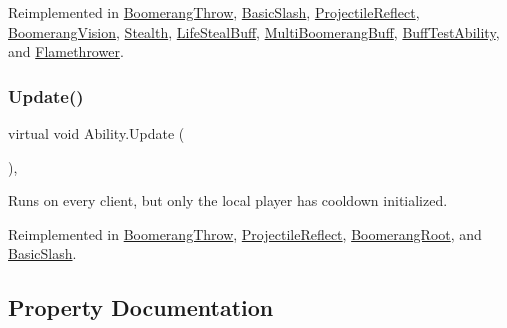 Reimplemented in \hyperlink{class_boomerang_throw_abd3070a4e57ae10d7578d6de618b5c2e}{Boomerang\+Throw}, \hyperlink{class_basic_slash_af42d098906ac33974f266ccc3b2aba6d}{Basic\+Slash}, \hyperlink{class_projectile_reflect_a13bdedc65cb8eed7f5d8a6a733feebe8}{Projectile\+Reflect}, \hyperlink{class_boomerang_vision_a3fff30008efe643eeee867fad5c68b06}{Boomerang\+Vision}, \hyperlink{class_stealth_a2f3bf9001b860f4b3935a83d8b085f63}{Stealth}, \hyperlink{class_life_steal_buff_a15b4e957b0023ccc3fe6349b721ed822}{Life\+Steal\+Buff}, \hyperlink{class_multi_boomerang_buff_a0c48dc1b79b214c087a53c2114b18c50}{Multi\+Boomerang\+Buff}, \hyperlink{class_buff_test_ability_a24f2ac23a4f1644af087c1e4162f4267}{Buff\+Test\+Ability}, and \hyperlink{class_flamethrower_a839995136fda8bb0ea556f3a1443253b}{Flamethrower}.

\hypertarget{class_ability_a88d799f38be464be5f0a9a315efb2d0b}{}\label{class_ability_a88d799f38be464be5f0a9a315efb2d0b} 
\subsubsection{\texorpdfstring{Update()}{Update()}}
{\footnotesize\ttfamily virtual void Ability.\+Update (\begin{DoxyParamCaption}{ }\end{DoxyParamCaption})\hspace{0.3cm}{\ttfamily [protected]}, {\ttfamily [virtual]}}



Runs on every client, but only the local player has cooldown initialized. 



Reimplemented in \hyperlink{class_boomerang_throw_a2388db1d5710a58189134f8359da2bc1}{Boomerang\+Throw}, \hyperlink{class_projectile_reflect_a81fc744408af168fb772d1c1f70d6f74}{Projectile\+Reflect}, \hyperlink{class_boomerang_root_ae237190bc2d4dbddcf21a25ee3c96dc9}{Boomerang\+Root}, and \hyperlink{class_basic_slash_a9bea8e187ba9a52f3a6ab0b48a218f60}{Basic\+Slash}.



\subsection{Property Documentation}
\hypertarget{class_ability_a0fbbf8eda910cd9463db7ef474da6019}{}\label{class_ability_a0fbbf8eda910cd9463db7ef474da6019} 
